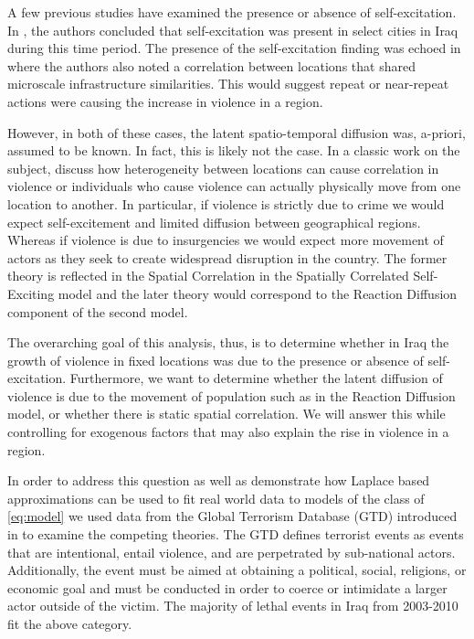 \documentclass[11pt]{isuthesis}
\begin{document}
A few previous studies have examined the presence or absence of self-excitation.  In \cite{lewis2012self}, the authors concluded that self-excitation was present in select cities in Iraq during this time period.  The presence of the self-excitation finding was echoed in \cite{braithwaite2015battle} where the authors also noted a correlation between locations that shared microscale infrastructure similarities.  This would suggest repeat or near-repeat actions were causing the increase in violence in a region.

However, in both of these cases, the latent spatio-temporal diffusion was, a-priori, assumed to be known.  In fact, this is likely not the case. In a classic work on the subject, \cite{midlarsky1980violence} discuss how heterogeneity between locations can cause correlation in violence or individuals who cause violence can actually physically move from one location to another.  In particular, if violence is strictly due to crime we would expect self-excitement and limited diffusion between geographical regions.  Whereas if violence is due to insurgencies we would expect more movement of actors as they seek to create widespread disruption in the country.
The former theory is reflected in the Spatial Correlation in the Spatially Correlated Self-Exciting model and the later theory would correspond to the Reaction Diffusion component of the second model.  

The overarching goal of this analysis, thus, is to determine whether in Iraq the growth of violence in fixed locations was due to the presence or absence of self-excitation.  Furthermore, we want to determine whether the latent diffusion of violence is due to the movement of population such as in the Reaction Diffusion model, or whether there is static spatial correlation.  We will answer this while controlling for exogenous factors that may also explain the rise in violence in a region.


In order to address this question as well as demonstrate how Laplace based approximations can be used to fit real world data to models of the class of \eqref{eq:model} we used data from the Global Terrorism Database (GTD) introduced in \cite{lafree2007introducing} to examine the competing theories.  The GTD defines terrorist events as events that are intentional, entail violence, and are perpetrated by sub-national actors.  Additionally, the event must be aimed at obtaining a political, social, religions, or economic goal and must be conducted in order to coerce or intimidate a larger actor outside of the victim.  The majority of lethal events in Iraq from 2003-2010 fit the above category.
\end{document}
